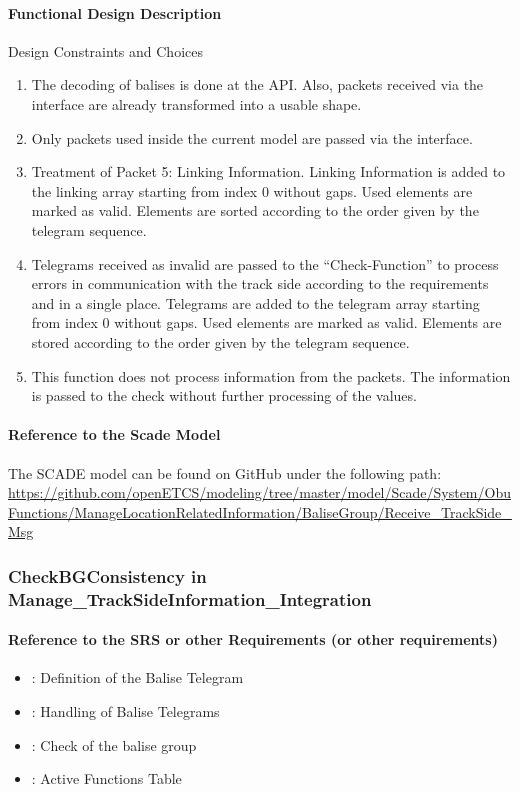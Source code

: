 \paragraph{Functional Design Description}
Design Constraints and Choices
\begin{enumerate}
\item The decoding of balises is done at the API. Also, packets received via the interface are already transformed into a usable shape.
\item Only packets used inside the current model are passed via the interface.
\item Treatment of Packet 5: Linking Information.
Linking Information is added to the linking array starting from index 0 without gaps. Used elements are marked as valid. Elements are sorted according to the order given by the telegram sequence.
\item Telegrams received as invalid are passed to the ``Check-Function'' to process errors in communication with the track side according to the requirements and in a single place.
Telegrams are added to the telegram array starting from index 0 without gaps. Used elements are marked as valid. Elements are stored according to the order given by the telegram sequence.
\item This function does not process information from the packets. The information is passed to the check without further processing of the values. 
\end{enumerate}

\paragraph{Reference to the Scade Model}
The SCADE model can be found on GitHub under the following path:
\url{https://github.com/openETCS/modeling/tree/master/model/Scade/System/ObuFunctions/ManageLocationRelatedInformation/BaliseGroup/Receive_TrackSide_Msg}


\subsubsection{CheckBGConsistency in Manage\_TrackSideInformation\_Integration}
\paragraph{Reference to the SRS or other Requirements (or other requirements)}
\begin{itemize}
  \item \cite[Chapt.~7 and 8]{subset-026}: Definition of the Balise Telegram
  \item \cite[Chapt.~3.4.1 - 3.4.3, 3.16.2]{subset-026}: Handling of Balise Telegrams
  \item \cite[Chapt.~3.16.2]{subset-026}: Check of the balise group
  \item \cite[Chapt.~4.5.2]{subset-026}: Active Functions Table
\end{itemize}

